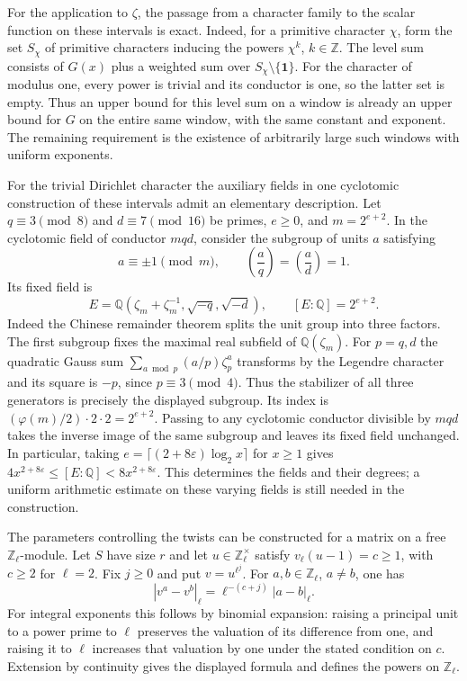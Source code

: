\documentclass[11pt]{amsart}
\theoremstyle{definition}
\theoremstyle{remark}
\begin{document}
For the application to $\zeta$, the passage from a character family
to the scalar function on these intervals is exact. Indeed, for a
primitive character $\chi$, form the set $S_\chi$ of primitive
characters inducing the powers $\chi^k$, $k\in\mathbb Z$. The level
sum consists of $G(x)$ plus a weighted sum over
$S_\chi\setminus\{\mathbf 1\}$. For the character of modulus one,
every power is trivial and its conductor is one, so the latter set is
empty. Thus an upper bound for this level sum on a window is already
an upper bound for $G$ on the entire same window, with the same
constant and exponent. The remaining requirement is the existence of
arbitrarily large such windows with uniform exponents.

For the trivial Dirichlet character the auxiliary fields in one
cyclotomic construction of these intervals admit an elementary
description. Let $q\equiv3\pmod8$ and $d\equiv7\pmod{16}$ be primes,
$e\ge0$, and $m=2^{e+2}$. In the cyclotomic field of conductor $mqd$,
consider the subgroup of units $a$ satisfying
\[
 a\equiv\pm1\pmod m,\qquad
 \left(\frac{a}{q}\right)=\left(\frac{a}{d}\right)=1.
\]
Its fixed field is
\[
 E=\mathbb Q(\zeta_m+\zeta_m^{-1},\sqrt{-q},\sqrt{-d}),
 \qquad [E:\mathbb Q]=2^{e+2}.
\]
Indeed the Chinese remainder theorem splits the unit group into three
factors. The first subgroup fixes the maximal real subfield of
$\mathbb Q(\zeta_m)$. For $p=q,d$ the quadratic Gauss sum
$\sum_{a\bmod p}(a/p)\zeta_p^a$ transforms by the Legendre character
and its square is $-p$, since $p\equiv3\pmod4$. Thus the stabilizer of
all three generators is precisely the displayed subgroup. Its index is
$(\varphi(m)/2)\cdot2\cdot2=2^{e+2}$. Passing to any cyclotomic
conductor divisible by $mqd$ takes the inverse image of the same
subgroup and leaves its fixed field unchanged. In particular, taking
$e=\lceil(2+8\varepsilon)\log_2 x\rceil$ for $x\ge1$ gives
$4x^{2+8\varepsilon}\le [E:\mathbb Q]<8x^{2+8\varepsilon}$.
This determines the fields and their degrees; a uniform arithmetic
estimate on these varying fields is still needed in the construction.

The parameters controlling the twists can be constructed for a
matrix on a free $\mathbb Z_\ell$-module. Let $S$ have size $r$ and
let $u\in\mathbb Z_\ell^\times$ satisfy $v_\ell(u-1)=c\ge1$,
with $c\ge2$ for $\ell=2$. Fix $j\ge0$ and put $v=u^{\ell^j}$.
For $a,b\in\mathbb Z_\ell$, $a\ne b$, one has
\[
 |v^a-v^b|_\ell=\ell^{-(c+j)}|a-b|_\ell .
\]
For integral exponents this follows by binomial expansion: raising
a principal unit to a power prime to $\ell$ preserves the valuation
of its difference from one, and raising it to $\ell$ increases that
valuation by one under the stated condition on $c$. Extension by
continuity gives the displayed formula and defines the powers on
$\mathbb Z_\ell$.
\end{document}
